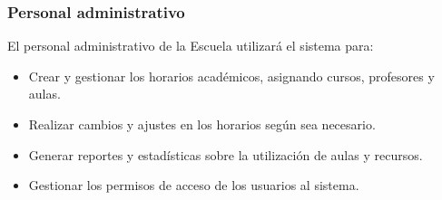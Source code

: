 \documentclass[12pt]{article} %
\begin{document}
    \subsubsection{Personal administrativo}
    \noindent
    El personal administrativo de la Escuela utilizará el sistema para:
    \begin{itemize}
        \item Crear y gestionar los horarios académicos, asignando cursos, profesores y aulas.
        \item Realizar cambios y ajustes en los horarios según sea necesario.
        \item Generar reportes y estadísticas sobre la utilización de aulas y recursos.
        \item Gestionar los permisos de acceso de los usuarios al sistema.    
    \end{itemize}
\end{document}
